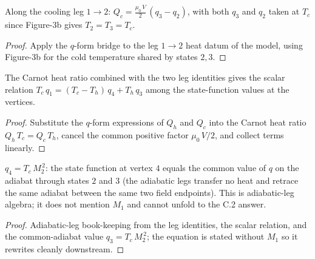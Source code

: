 \begin{lemma}
\label{lem:IPhO2026Problems_problem_IPhO_2026_3_C_2:Qc_eq}
Along the cooling leg $1 \to 2$:
$Q_c = \frac{\mu_0\,V}{2}\,(q_3 - q_2)$, with both $q_3$ and $q_2$
taken at $T_c$ since Figure-3b gives $T_2 = T_3 = T_c$.
\end{lemma}
\begin{proof}
Apply the $q$-form bridge to the leg $1 \to 2$ heat datum of the
model, using Figure-3b for the cold temperature shared by states
$2, 3$.
\end{proof}

\begin{lemma}
\label{lem:IPhO2026Problems_problem_IPhO_2026_3_C_2:q_relation}
The Carnot heat ratio combined with the two leg identities gives the
scalar relation
$T_c\,q_1 = (T_c - T_h)\,q_4 + T_h\,q_3$
among the state-function values at the vertices.
\end{lemma}
\begin{proof}
Substitute the $q$-form expressions of $Q_h$ and $Q_c$ into the
Carnot heat ratio $Q_h\,T_c = Q_c\,T_h$, cancel the common positive
factor $\mu_0\,V/2$, and collect terms linearly.
\end{proof}

\begin{lemma}
\label{lem:IPhO2026Problems_problem_IPhO_2026_3_C_2:q4_eq_adiabatic_41}
$q_4 = T_c\,M_2^{\,2}$: the state function at vertex $4$ equals the
common value of $q$ on the adiabat through states $2$ and $3$ (the
adiabatic legs transfer no heat and retrace the same adiabat between
the same two field endpoints). This is adiabatic-leg algebra; it does
not mention $M_1$ and cannot unfold to the C.2 answer.
\end{lemma}
\begin{proof}
Adiabatic-leg book-keeping from the leg identities, the scalar
relation, and the common-adiabat value $q_3 = T_c\,M_2^{\,2}$; the
equation is stated without $M_1$ so it rewrites cleanly downstream.
\end{proof}

